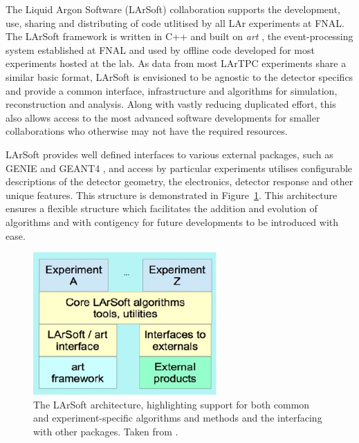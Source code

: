 The Liquid Argon Software (LArSoft) \cite{LArSoftWebsite,LArSoft2013,LArSoft2016,Snider2016} collaboration supports the development, use, sharing and distributing of code utlitised by all LAr experiments at FNAL.  The LArSoft framework is written in C++ and built on \textit{art} \cite{artWebsite,art2012}, the event-processing system established at FNAL and used by offline code developed for most experiments hosted at the lab.  As data from most LArTPC experiments share a similar basic format, LArSoft is envisioned to be agnostic to the detector specifics and provide a common interface, infrastructure and algorithms for simulation, reconstruction and analysis.  Along with vastly reducing duplicated effort, this also allows access to the most advanced software developments for smaller collaborations who otherwise may not have the required resources.

LArSoft provides well defined interfaces to various external packages, such as GENIE \cite{GENIE2010} and GEANT4 \cite{GEANT42006}, and access by particular experiments utilises configurable descriptions of the detector geometry, the electronics, detector response and other unique features.  This structure is demonstrated in Figure~\ref{fig:LArSoftStructure}.  This architecture ensures a flexible structure which facilitates the addition and evolution of algorithms and with contigency for future developments to be introduced with ease.

\begin{figure}
  \centering
  \includegraphics[width=7cm]{LArSoftStructure.pdf}
  \caption[The LArSoft architecture, highlighting support for both common and experiment-specific algorithms and methods and the interfacing with other packages.]{The LArSoft architecture, highlighting support for both common and experiment-specific algorithms and methods and the interfacing with other packages.  Taken from \cite{LArSoft2016}.}
  \label{fig:LArSoftStructure}
\end{figure}

